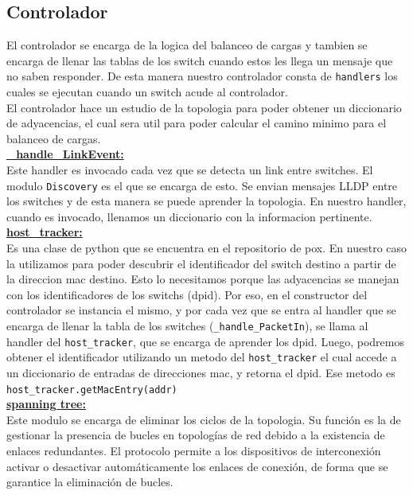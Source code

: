 \subsection{Controlador}
	El controlador se encarga de la logica del balanceo de cargas y tambien se encarga de llenar las tablas de los switch cuando estos les 		llega un mensaje que no saben responder. De esta manera nuestro controlador consta de \lstinline[columns=fixed]{handlers} los cuales se 	ejecutan cuando un switch acude al controlador.\\
	El controlador hace un estudio de la topologia para poder obtener un diccionario de adyacencias, el cual sera util para poder calcular 		el camino minimo para el balanceo de cargas.\\
	\underline{\textbf{\_handle\_LinkEvent:}}\\
		Este handler es invocado cada vez que se detecta un link entre switches. El modulo \lstinline[columns=fixed]{Discovery} es el 			que se encarga de esto. Se envian mensajes LLDP entre los switches y de esta manera se puede aprender la topologia. En nuestro 			handler, cuando es invocado, llenamos un diccionario con la informacion pertinente.\\
	\underline{\textbf{host\_tracker:}}\\
		Es una clase de python que se encuentra en el repositorio de pox. En nuestro caso la utilizamos para poder descubrir el 		identificador del switch destino a partir de la direccion mac destino. Esto lo necesitamos porque las adyacencias se manejan 			con los identificadores de los switchs (dpid). Por eso, en el constructor del controlador se instancia el mismo, y por cada vez 		que se entra al handler que se encarga de llenar la tabla de los switches (\lstinline[columns=fixed]{_handle_PacketIn}), se 			llama al handler del \lstinline[columns=fixed]{host_tracker}, que se encarga de aprender los dpid. Luego, podremos obtener el 			identificador utilizando un metodo del \lstinline[columns=fixed]{host_tracker} el cual accede a un diccionario de entradas de 			direcciones mac, y retorna el dpid. Ese metodo es \lstinline[columns=fixed]{host_tracker.getMacEntry(addr)}\\
	\underline{\textbf{spanning tree:}}\\
		Este modulo se encarga de eliminar los ciclos de la topologia. Su función es la de gestionar la presencia de bucles en 			topologías de red debido a la existencia de enlaces redundantes. El protocolo permite a los dispositivos de interconexión 			activar o desactivar automáticamente los enlaces de conexión, de forma que se garantice la eliminación de bucles.\\
